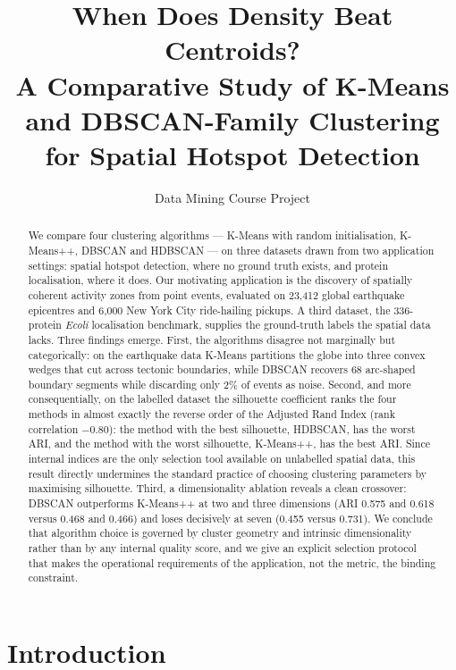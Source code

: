 \documentclass[11pt,a4paper]{article}
\title{\vspace{-1.2cm}\textbf{When Does Density Beat Centroids?\\
A Comparative Study of K-Means and DBSCAN-Family Clustering\\
for Spatial Hotspot Detection}}
\author{Data Mining Course Project}
\date{}
\begin{document}
\maketitle
\vspace{-0.9cm}

\begin{abstract}
\noindent
We compare four clustering algorithms --- K-Means with random initialisation,
K-Means++, DBSCAN and HDBSCAN --- on three datasets drawn from two application
settings: spatial hotspot detection, where no ground truth exists, and protein
localisation, where it does. Our motivating application is the discovery of
spatially coherent activity zones from point events, evaluated on 23{,}412
global earthquake epicentres and 6{,}000 New York City ride-hailing pickups. A
third dataset, the 336-protein \emph{Ecoli} localisation benchmark, supplies the
ground-truth labels the spatial data lacks. Three findings emerge. First, the
algorithms disagree not marginally but categorically: on the earthquake data
K-Means partitions the globe into three convex wedges that cut across tectonic
boundaries, while DBSCAN recovers 68 arc-shaped boundary segments while
discarding only 2\% of events as noise. Second, and more consequentially, on the
labelled dataset the silhouette coefficient ranks the four methods in almost
exactly the reverse order of the Adjusted Rand Index (rank correlation
$-0.80$): the method with the best silhouette, HDBSCAN, has the worst ARI, and
the method with the worst silhouette, K-Means++, has the best ARI. Since
internal indices are the only selection tool available on unlabelled spatial
data, this result directly undermines the standard practice of choosing
clustering parameters by maximising silhouette. Third, a dimensionality ablation
reveals a clean crossover: DBSCAN outperforms K-Means++ at two and three
dimensions (ARI 0.575 and 0.618 versus 0.468 and 0.466) and loses decisively at
seven (0.455 versus 0.731). We conclude that algorithm choice is governed by
cluster geometry and intrinsic dimensionality rather than by any internal
quality score, and we give an explicit selection protocol that makes the
operational requirements of the application, not the metric, the binding
constraint.
\end{abstract}

\section{Introduction}
\end{document}
